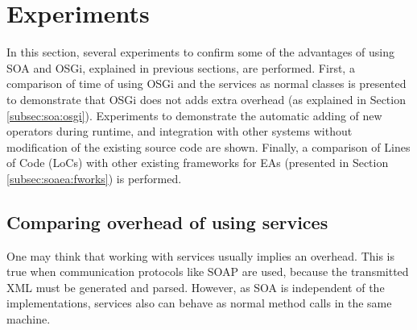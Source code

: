 \section{Experiments} %
\label{sec:osgiliath:experiments}
In this section, several experiments to confirm some of the advantages of using SOA and OSGi, explained in previous sections, are performed. First, a comparison of time of using OSGi and the services as normal classes is presented to demonstrate that OSGi does not adds extra overhead (as explained in Section \ref{subsec:soa:osgi}). Experiments to demonstrate the automatic adding of new operators during runtime, and integration with other systems without modification of the existing source code are shown. Finally, a comparison of Lines of Code (LoCs) with other existing frameworks for EAs (presented in Section \ref{subsec:soaea:fworks}) is performed.

\subsection{Comparing overhead of using services}
\label{subsec:osgiliath:comparingoverhead}
One may think that working with services usually implies an
overhead. This is true when communication protocols like SOAP are
used, because the transmitted XML must be generated and
parsed. However, as SOA is independent of the implementations,
services also can behave as normal method calls in the same machine. 


